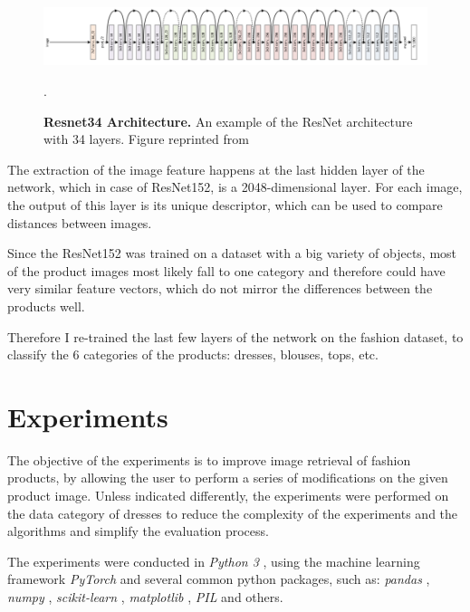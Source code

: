 \documentclass{article}
\begin{document}
\begin{figure}[h]
\centering
{\includegraphics[width=\linewidth]{CBIR/resnet_arch}}
\caption{\label{fig:search_pink} \textbf{Resnet34 Architecture.} An example of the ResNet architecture with 34 layers. Figure reprinted from \cite{noauthor_resnet-152_nodate}}.
\end{figure}

The extraction of the image feature happens at the last hidden layer of the network, which in case of ResNet152, is a 2048-dimensional layer. For each image, the output of this layer is its unique descriptor, which can be used to compare distances between images.

Since the ResNet152 was trained on a dataset with a big variety of objects, most of the product images most likely fall to one category and therefore could have very similar feature vectors, which do not mirror the differences between the products well.

Therefore I re-trained the last few layers of the network on the fashion dataset, to classify the 6 categories of the products: dresses, blouses, tops, etc. 


\pagebreak
\section{Experiments}
The objective of the experiments is to improve image retrieval of fashion products, by allowing the user to perform a series of modifications on the given product image. Unless indicated differently, the experiments were performed on the data category of dresses to reduce the complexity of the experiments and the algorithms and simplify the evaluation process.

The experiments were conducted in \textit{Python 3} \cite{noauthor_welcome_nodate}, using the machine learning framework \textit{PyTorch} \cite{noauthor_pytorch_nodate} and several common python packages, such as: \textit{pandas} \cite{noauthor_python_nodate}, \textit{numpy} \cite{noauthor_numpy_nodate}, \textit{scikit-learn} \cite{noauthor_scikit-learn_nodate}, \textit{matplotlib} \cite{noauthor_matplotlib_nodate}, \textit{PIL} \cite{noauthor_pillow_nodate} and others. 
\end{document}
